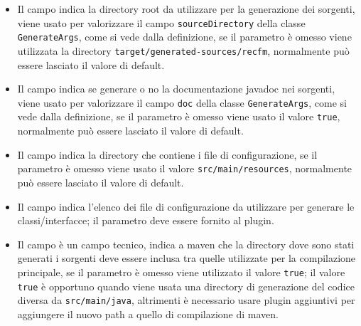 \documentclass[a4paper,10pt]{report}
\begin{document}
\begin{itemize}
\item {}
	Il campo  indica la 
	directory root da utilizzare per la generazione dei sorgenti, viene usato 
	per valorizzare il campo \verb!sourceDirectory! della classe 
	\verb!GenerateArgs!, come si vede dalla definizione, se il parametro è 
	omesso viene utilizzata la directory \verb!target/generated-sources/recfm!, 
	normalmente può essere lasciato il valore di default.
\item {}
	Il campo  indica se generare o no 
	la documentazione javadoc nei sorgenti, viene usato per valorizzare il campo 
	\verb!doc! della classe \verb!GenerateArgs!, come si vede dalla definizione, 
	se il parametro è omesso viene usato il valore \verb!true!, normalmente può 
	essere lasciato il valore di default.
\item {}
	Il campo  indica la 
	directory che contiene i file	di configurazione, se il parametro è omesso 
	viene usato il valore \verb!src/main/resources!, normalmente può essere 
	lasciato il valore di default.
\item {}
	Il campo  indica l'elenco dei 
	file di configurazione da utilizzare per generare le classi/interfacce; il 
	parametro deve essere fornito al plugin.
\item {}
	Il campo  è un 
	campo tecnico, indica a maven che la directory dove sono stati generati i 
	sorgenti deve essere inclusa tra quelle utilizzate per la compilazione 
	principale, se il parametro è omesso viene utilizzato il valore 
	\verb!true!; il valore \verb!true! è opportuno quando viene usata una 
	directory di generazione del codice diversa da \verb!src/main/java!, 
	altrimenti è necessario usare plugin aggiuntivi per aggiungere il nuovo path 
	a quello di compilazione di maven.

\end{itemize}
\end{document}
